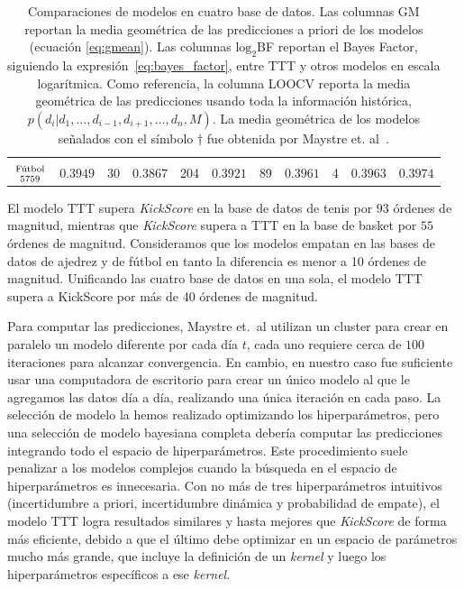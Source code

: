 \documentclass[a4paper,11pt]{book}
\newcommand\hfrac[2]{\genfrac{}{}{0pt}{}{#1}{#2}} %
\theoremstyle{definition}
\newif\ifen
\newcommand{\en}[1]{\ifen#1\fi}
\begin{document}
\begin{table}[ht!]
\begin{tabular}{c|cc|cc|cc|cc|c||c}
 & & & & & & & & & \\
 \multirow{2}{*}{$\hfrac{\text{\scriptsize \en{Football}F\'utbol}}{\num{5759}}$} & \multirow{2}{*}{$0.3949$} & \multirow{2}{*}{\num{30}} & \multirow{2}{*}{$0.3867$} & \multirow{2}{*}{\num{204}} & \multirow{2}{*}{$0.3921$} & \multirow{2}{*}{\num{89}} & \multirow{2}{*}{$\bm{0.3961}$} & \multirow{2}{*}{\num{4}} & \multirow{2}{*}{$\bm{0.3963}$} &  \multirow{2}{*}{${0.3974}$} \\
  & & & & & & & & & & \\ \hline
  \end{tabular}
  \caption{
  Comparaciones de modelos en cuatro base de datos.
  Las columnas GM reportan la media geom\'etrica de las predicciones a priori de los modelos (ecuaci\'on \ref{eq:gmean}).
  Las columnas $\text{log}_2$BF reportan el Bayes Factor, siguiendo la expresi\'on~\eqref{eq:bayes_factor}, entre TTT y otros modelos en escala logar\'itmica.
  Como referencia, la columna LOOCV reporta la media geom\'etrica de las predicciones usando toda la informaci\'on hist\'orica, $p(d_i| d_1, \dots, d_{i-1}, d_{i+1}, \dots, d_n , M)$.
  La media geom\'etrica de los modelos se\~nalados con el s\'imbolo $\dagger$ fue obtenida por Maystre et. al~\cite{Maystre2019}.
  }
  \label{Tab:Models}
\end{table}
%
El modelo TTT supera \emph{KickScore} en la base de datos de tenis por $93$ \'ordenes de magnitud, mientras que \emph{KickScore} supera a TTT en la base de basket por $55$ \'ordenes de magnitud.
%
Consideramos que los modelos empatan en las bases de datos de ajedrez y de f\'utbol en tanto la diferencia es menor a 10 \'ordenes de magnitud.
%
Unificando las cuatro base de datos en una sola, el modelo TTT supera a KickScore por m\'as de 40 \'ordenes de magnitud.

Para computar las predicciones, Maystre et.~al utilizan un cluster para crear en paralelo un modelo diferente por cada d\'ia $t$, cada uno requiere cerca de $100$ iteraciones para alcanzar convergencia.
%
En cambio, en nuestro caso fue suficiente usar una computadora de escritorio para crear un \'unico modelo al que le agregamos las datos d\'ia a d\'ia, realizando una \'unica iteraci\'on en cada paso.
%
La selecci\'on de modelo la hemos realizado optimizando los hiperpar\'ametros, pero una selecci\'on de modelo bayesiana completa deber\'ia computar las predicciones integrando todo el espacio de hiperpar\'ametros.
%
Este procedimiento suele penalizar a los modelos complejos cuando la b\'usqueda en el espacio de hiperpar\'ametros es innecesaria.
%
Con no m\'as de tres hiperpar\'ametros intuitivos (incertidumbre a priori, incertidumbre din\'amica y probabilidad de empate), el modelo TTT logra resultados similares y hasta mejores que \emph{KickScore} de forma m\'as eficiente, debido a que el \'ultimo debe optimizar en un espacio de par\'ametros mucho m\'as grande, que incluye la definici\'on de un \emph{kernel} y luego los hiperpar\'ametros espec\'ificos a ese \emph{kernel}.
\end{document}
